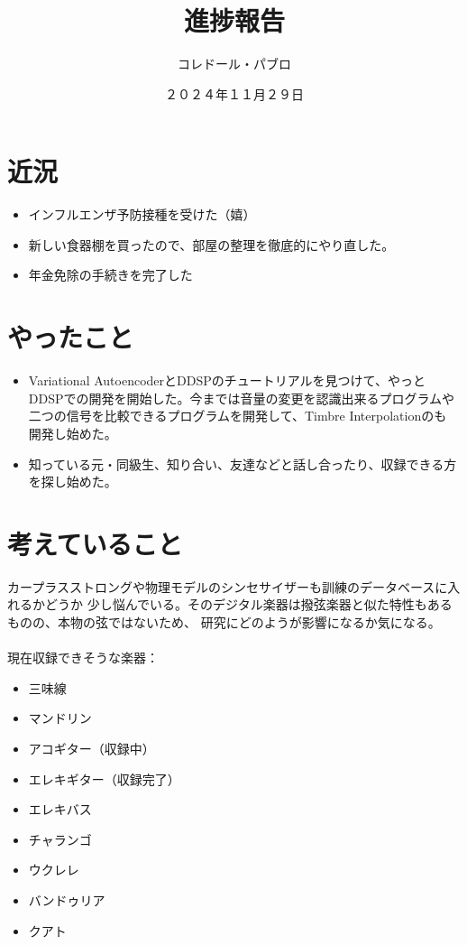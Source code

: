 \documentclass[a4paper, 12pt]{article}
\title{進捗報告}
\author{コレドール・パブロ}
\date{２０２４年１１月２９日}
\begin{document}
\maketitle

\section*{近況}
\begin{itemize}
    \item インフルエンザ予防接種を受けた（嬉）
    \item 新しい食器棚を買ったので、部屋の整理を徹底的にやり直した。
    \item 年金免除の手続きを完了した
\end{itemize} 

\section*{やったこと}
\begin{itemize}
    \item Variational AutoencoderとDDSPのチュートリアルを見つけて\cite{autoencoder_tutorial}、やっと
    DDSPでの開発を開始した。今までは音量の変更を認識出来るプログラムや
    二つの信号を比較できるプログラムを開発して、Timbre Interpolationのも
    開発し始めた。
    \item 知っている元・同級生、知り合い、友達などと話し合ったり、収録できる方を探し始めた。
\end{itemize}

\section*{考えていること}

カープラスストロングや物理モデルのシンセサイザーも訓練のデータベースに入れるかどうか
少し悩んでいる。そのデジタル楽器は撥弦楽器と似た特性もあるものの、本物の弦ではないため、
研究にどのようが影響になるか気になる。\\~\\
現在収録できそうな楽器：
\begin{itemize}
    \item 三味線
    \item マンドリン
    \item アコギター（収録中）
    \item エレキギター（収録完了）
    \item エレキバス
    \item チャランゴ
    \item ウクレレ
    \item バンドゥリア
    \item クアト\\
\end{itemize}
\end{document}
